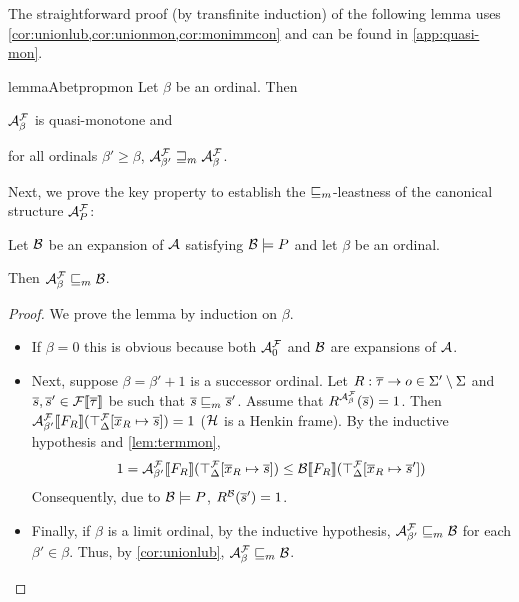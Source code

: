 \documentclass[a4paper,twoside,notitlepage,openright,11pt]{report}
\begin{document}
The straightforward proof (by transfinite induction) of the following lemma uses \cref{cor:unionlub,cor:unionmon,cor:monimmcon} and can be found in \cref{app:quasi-mon}.
\begin{restatable}{lemma}{Abetpropmon}
  \label{lem:Abetpropmon}
  Let $\beta$ be an ordinal. Then
  \begin{thmlist}
    \item\label{lem:Abetmon} $\mathcal A^\mathcal F_\beta$ is quasi-monotone and
    \item\label{lem:Abetpmon} for all ordinals $\beta'\geq\beta$, $\mathcal A^\mathcal F_{\beta'}\sqsupseteq_m\mathcal A^\mathcal F_\beta$.
  \end{thmlist}
\end{restatable}
Next, we prove the key property to establish the $\sqsubseteq_m$-leastness of the canonical structure $\mathcal A^\mathcal F_P$:
  \begin{proposition}
    \label{lem:canmod}
    Let $\mathcal B$ be an expansion of $\mathcal A$ satisfying $\mathcal B\models P$ and let $\beta$ be an ordinal. 

    Then $\mathcal A^\mathcal F_\beta\sqsubseteq_m\mathcal B$.
  \end{proposition}
  \begin{proof}
    We prove the lemma by induction on $\beta$.
    \begin{itemize}[noitemsep]
    \item If $\beta=0$ this is obvious because both $\mathcal A^\mathcal F_0$ and $\mathcal B$ are expansions of $\mathcal A$.
    \item Next, suppose $\beta=\beta'+1$ is a successor ordinal. Let $R:\overline\tau\to o\in\Sigma'\setminus\Sigma$ and $\overline s,\overline s'\in{\mathcal F}\llbracket\overline\tau\rrbracket$ be such that $\overline s\sqsubseteq_m\overline s'$. Assume that $R^{\mathcal A^\mathcal F_\beta}(\overline s)=1$. Then ${\mathcal A^\mathcal F_{\beta'}}\llbracket F_R\rrbracket(\top_\Delta^\mathcal F[\overline x_R\mapsto\overline s])=1$ ($\mathcal H$ is a Henkin frame). By the inductive hypothesis and \cref{lem:termmon},
      \begin{align*}
        1={\mathcal A^\mathcal F_{\beta'}}\llbracket F_R\rrbracket(\top_\Delta^\mathcal F[\overline x_R\mapsto\overline s])\leq{\mathcal B}\llbracket F_R\rrbracket(\top_\Delta^\mathcal F[\overline x_R\mapsto\overline s'])
      \end{align*}
      Consequently, due to $\mathcal B\models P$, $R^\mathcal B(\overline s')=1$.
    \item Finally, if $\beta$ is a limit ordinal, by the inductive hypothesis, $\mathcal A^\mathcal F_{\beta'}\sqsubseteq_m\mathcal B$ for each $\beta'\in\beta$. Thus, by \cref{cor:unionlub}, $\mathcal A^\mathcal F_\beta\sqsubseteq_m\mathcal B$.\qedhere
    \end{itemize}
  \end{proof}
\end{document}
